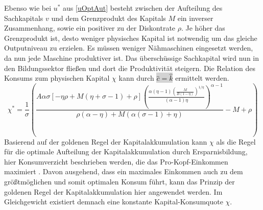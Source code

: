 Ebenso wie bei $u^*$ aus \eqref{uOptAut} besteht zwischen der Aufteilung des Sachkapitals $v$ und dem Grenzprodukt des Kapitals $M$ ein inverser Zusammenhang,
 sowie ein positiver zu der Diskontrate $\rho$. Je höher das Grenzprodukt ist, desto weniger physisches Kapital ist notwendig um das gleiche Outputniveau zu erzielen. Es müssen weniger Nähmaschinen eingesetzt werden, da nun jede Maschine produktiver ist. Das überschüssige Sachkapital wird nun in den Bildungssektor flie{\ss}en und dort die Produktivität steigern. 
Die Relation des Konsums zum physischen Kapital $\chi$ kann durch \colorbox{lightgray}{$\hat{c}=\hat{k}$} ermittelt werden.
\begin{equation}
\boxed{\chi^*=\frac{1}{\sigma}\left(\frac{A\alpha \sigma[-\eta\rho+M(\eta+\sigma-1)+\rho] \left(\frac{\alpha  (\eta -1) \left(\frac{M}{B (1-\eta) }\right)^{1/\eta }}{(\alpha -1) \eta }\right)^{\alpha -1}}{\rho  (\alpha -\eta )+M (\alpha  (\sigma -1)+\eta )}-M+\rho\right)}
\end{equation}
Basierend auf der goldenen Regel der Kapitalakkumulation kann $\chi$ als die Regel für die optimale Aufteilung der Kapitalakkumulation durch Ersparnisbildung, hier Konsumverzicht beschrieben werden, die das Pro-Kopf-Einkommen maximiert \citet{Nelson.1966}. Davon ausgehend, dass ein maximales Einkommen auch zu dem grö{\ss}tmöglichen und somit optimalen Konsum führt, kann das Prinzip der goldenen Regel der Kapitalakkumulation hier angewendet werden. Im Gleichgewicht existiert demnach eine konstante Kapital-Konsumquote $\chi$.

